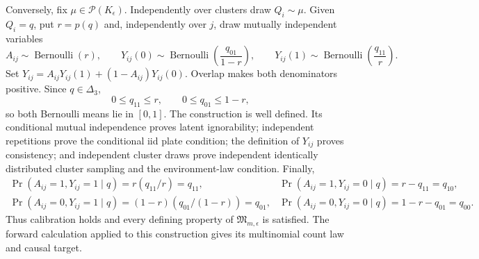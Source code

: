 Conversely, fix \(\mu\in\mathcal P(K_{\epsilon})\).  Independently over clusters draw \(Q_i\sim\mu\).  Given \(Q_i=q\), put \(r=p(q)\) and, independently over \(j\), draw mutually independent variables
\[
 A_{ij}\sim\operatorname{Bernoulli}(r),\qquad
 Y_{ij}(0)\sim\operatorname{Bernoulli}\!\left(\frac{q_{01}}{1-r}\right),\qquad
 Y_{ij}(1)\sim\operatorname{Bernoulli}\!\left(\frac{q_{11}}r\right).
\]
Set \(Y_{ij}=A_{ij}Y_{ij}(1)+(1-A_{ij})Y_{ij}(0)\).  Overlap makes both denominators positive.  Since \(q\in\Delta_3\),
\[
 0\leq q_{11}\leq r,
 \qquad
 0\leq q_{01}\leq1-r,
\]
so both Bernoulli means lie in \([0,1]\).  The construction is well defined.  Its conditional mutual independence proves latent ignorability; independent repetitions prove the conditional iid plate condition; the definition of \(Y_{ij}\) proves consistency; and independent cluster draws prove independent identically distributed cluster sampling and the environment-law condition.  Finally,
\[
 \begin{array}{ll}
 \Pr(A_{ij}=1,Y_{ij}=1\mid q)=r(q_{11}/r)=q_{11},
 &\Pr(A_{ij}=1,Y_{ij}=0\mid q)=r-q_{11}=q_{10},\\[4pt]
 \Pr(A_{ij}=0,Y_{ij}=1\mid q)=(1-r)(q_{01}/(1-r))=q_{01},
 &\Pr(A_{ij}=0,Y_{ij}=0\mid q)=1-r-q_{01}=q_{00}.
 \end{array}
\]
Thus calibration holds and every defining property of \(\mathfrak M_{m,\epsilon}\) is satisfied.  The forward calculation applied to this construction gives its multinomial count law and causal target.